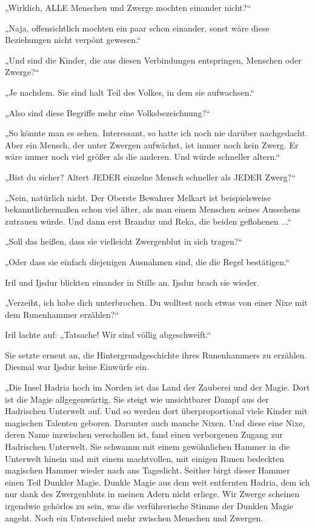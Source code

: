„Wirklich, ALLE Menschen und Zwerge mochten einander nicht?“

„Naja, offensichtlich mochten ein paar schon einander, sonst wäre diese Beziehungen nicht verpönt gewesen.“

„Und sind die Kinder, die aus diesen Verbindungen entspringen, Menschen oder Zwerge?“

„Je nachdem. Sie sind halt Teil des Volkes, in dem sie aufwachsen.“

„Also sind diese Begriffe mehr eine Volksbezeichnung?“

„So könnte man es sehen. Interessant, so hatte ich noch nie darüber nachgedacht. Aber ein Mensch, der unter Zwergen aufwächst, ist immer noch kein Zwerg. Er wäre immer noch viel größer als die anderen. Und würde schneller altern.“

„Bist du sicher? Altert JEDER einzelne Mensch schneller als JEDER Zwerg?“

„Nein, natürlich nicht. Der Oberste Bewahrer Melkart ist beispielsweise bekanntlichermaßen schon viel älter, als man einem Menschen seines Aussehens zutrauen würde. Und dann erst Brandur und Reka, die beiden geflohenen ...“

„Soll das heißen, dass sie vielleicht Zwergenblut in sich tragen?“

„Oder dass sie einfach diejenigen Ausnahmen sind, die die Regel bestätigen.“

Iril und Ijsdur blickten einander in Stille an. Ijsdur brach sie wieder.

„Verzeiht, ich habe dich unterbrochen. Du wolltest noch etwas von einer Nixe mit dem Runenhammer erzählen?“

Iril lachte auf: „Tatsache! Wir sind völlig abgeschweift.“

Sie setzte erneut an, die Hintergrundgeschichte ihres Runenhammers zu erzählen. Diesmal war Ijsdur keine Einwürfe ein.

„Die Insel Hadria hoch im Norden ist das Land der Zauberei und der Magie. Dort ist die Magie allgegenwärtig. Sie steigt wie unsichtbarer Dampf aus der Hadrischen Unterwelt auf. Und so werden dort überproportional viele Kinder mit magischen Talenten geboren. Darunter auch manche Nixen. Und diese eine Nixe, deren Name inzwischen verschollen ist, fand einen verborgenen Zugang zur Hadrischen Unterwelt. Sie schwamm mit einem gewöhnlichen Hammer in die Unterwelt hinein und mit einem machtvollen, mit einigen Runen bedeckten magischen Hammer wieder nach ans Tageslicht. Seither birgt dieser Hammer einen Teil Dunkler Magie. Dunkle Magie aus dem weit entfernten Hadria, dem ich nur dank des Zwergenbluts in meinen Adern nicht erliege. Wir Zwerge scheinen irgendwie gehörlos zu sein, was die verführerische Stimme der Dunklen Magie angeht. Noch ein Unterschied mehr zwischen Menschen und Zwergen.

